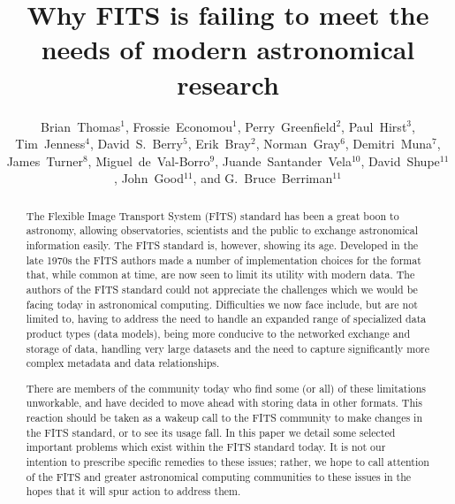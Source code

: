 \documentclass[11pt,twoside]{article}
\begin{document}
\title{Why FITS is failing to meet the needs of modern astronomical
  research}
\author{Brian~Thomas$^1$, Frossie~Economou$^1$, Perry~Greenfield$^2$,
Paul~Hirst$^3$, Tim~Jenness$^4$, David~S.~Berry$^5$, Erik~Bray$^2$,
Norman~Gray$^6$, Demitri~Muna$^7$, James~Turner$^8$,
Miguel~de~Val-Borro$^9$, Juande~Santander~Vela$^{10}$,
David~Shupe$^{11}$, John~Good$^{11}$, and G.~Bruce~Berriman$^{11}$
}

\begin{abstract}
  The Flexible Image Transport System (FITS) standard has been a great
  boon to astronomy, allowing observatories, scientists and the public
  to exchange astronomical information easily. The FITS standard is,
  however, showing its age. Developed in the late 1970s the FITS
  authors made a number of implementation choices for the format that,
  while common at time, are now seen to limit its utility with modern
  data. The authors of the FITS standard could not appreciate the
  challenges which we would be facing today in astronomical
  computing. Difficulties we now face include, but are not limited to,
  having to address the need to handle an expanded range of
  specialized data product types (data models), being more conducive
  to the networked exchange and storage of data, handling very large
  datasets and the need to capture significantly more complex metadata
  and data relationships.

  There are members of the community today who find some (or all) of
  these limitations unworkable, and have decided to move ahead with
  storing data in other formats. This reaction should be taken as a
  wakeup call to the FITS community to make changes in the FITS
  standard, or to see its usage fall. In this paper we detail some
  selected important problems which exist within the FITS standard
  today.  It is not our intention to prescribe specific remedies to
  these issues; rather, we hope to call attention of the FITS and
  greater astronomical computing communities to these issues in the
  hopes that it will spur action to address them.
\end{abstract}
\end{document}
